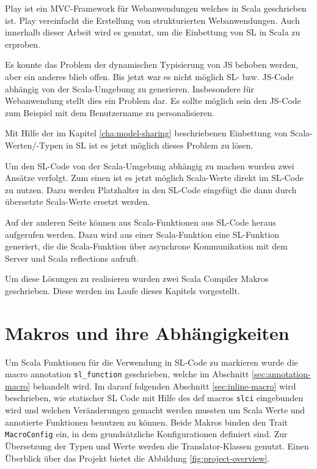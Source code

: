 \documentclass[12pt,bibtotoc]{scrreprt}
\begin{document}
Play ist ein \ac{MVC}-Framework für Webanwendungen welches in Scala geschrieben ist. Play vereinfacht die Erstellung von strukturierten Webanwendungen. Auch innerhalb dieser Arbeit wird es genutzt, um die Einbettung von SL in Scala zu erproben.

Es konnte das Problem der dynamischen Typisierung von JS behoben werden, aber ein anderes blieb offen. Bis jetzt war es nicht möglich SL- bzw. JS-Code abhängig von der Scala-Umgebung zu generieren. Insbesondere für Webanwendung stellt dies ein Problem dar. Es sollte möglich sein den JS-Code zum Beispiel mit dem Benutzername zu personalisieren. 

Mit Hilfe der im Kapitel \ref{cha:model-sharing} beschriebenen Einbettung von Scala-Werten/-Typen in SL ist es jetzt möglich dieses Problem zu lösen.

Um den SL-Code von der Scala-Umgebung abhängig zu machen wurden zwei Ansätze verfolgt. Zum einen ist es jetzt möglich Scala-Werte direkt im SL-Code zu nutzen. Dazu werden Platzhalter in den SL-Code eingefügt die dann durch übersetzte Scala-Werte ersetzt werden.

Auf der anderen Seite können aus Scala-Funktionen aus SL-Code heraus aufgerufen werden. Dazu wird aus einer Scala-Funktion eine SL-Funktion generiert, die die Scala-Funktion über asynchrone Kommunikation mit dem Server und Scala reflections aufruft.

Um diese Lösungen zu realisieren wurden zwei Scala Compiler Makros geschrieben. Diese werden im Laufe dieses Kapitels vorgestellt.

\section{Makros und ihre Abhängigkeiten}
\label{sec:project-structure}

Um Scala Funktionen für die Verwendung in \ac{SL}-Code zu markieren wurde die macro annotation \lstinline!sl_function! geschrieben, welche im Abschnitt \ref{sec:annotation-macro} behandelt wird. Im darauf folgenden Abschnitt \ref{sec:inline-macro} wird beschrieben, wie statischer \ac{SL} Code mit Hilfe des def macros \lstinline!slci! eingebunden wird und welchen Veränderungen gemacht werden mussten um Scala Werte und annotierte Funktionen benutzen zu können. Beide Makros binden den Trait \lstinline!MacroConfig! ein, in dem grundsätzliche Konfigurationen definiert sind. Zur Übersetzung der Typen und Werte werden die Translator-Klassen genutzt. Einen Überblick über das Projekt bietet die Abbildung \ref{fig:project-overview}.
\end{document}
